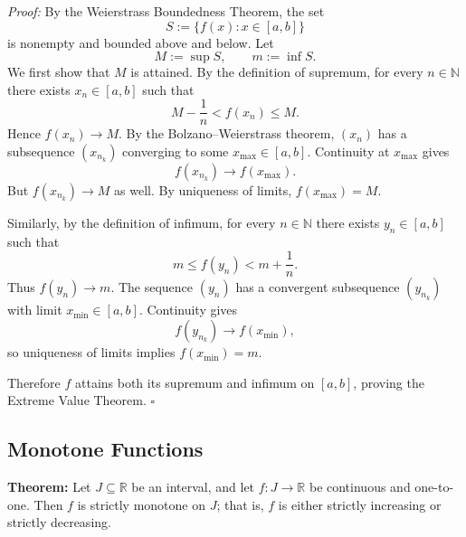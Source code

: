 \documentclass[a4paper,11pt,abstracton]{scrartcl}
\newcommand{\RR}{\mathbb{R}}
\theoremstyle{dotlessP}
\theoremstyle{dotlessS}
\theoremstyle{remark}
\theoremstyle{definition}
\begin{document}
\begin{claim_box}
\textit{Proof:}
By the Weierstrass Boundedness Theorem, the set
\[
    S:=\{f(x):x\in[a,b]\}
\]
is nonempty and bounded above and below. Let
\[
    M:=\sup S,\qquad m:=\inf S.
\]
We first show that $M$ is attained. By the definition of supremum, for every $n\in\mathbb N$ there exists $x_n\in[a,b]$ such that
\[
    M-\frac1n<f(x_n)\le M.
\]
Hence $f(x_n)\to M$. By the Bolzano--Weierstrass theorem, $(x_n)$ has a subsequence $(x_{n_k})$ converging to some $x_{\max}\in[a,b]$. Continuity at $x_{\max}$ gives
\[
    f(x_{n_k})\longrightarrow f(x_{\max}).
\]
But $f(x_{n_k})\to M$ as well. By uniqueness of limits, $f(x_{\max})=M$.

Similarly, by the definition of infimum, for every $n\in\mathbb N$ there exists $y_n\in[a,b]$ such that
\[
    m\le f(y_n)<m+\frac1n.
\]
Thus $f(y_n)\to m$. The sequence $(y_n)$ has a convergent subsequence $(y_{n_k})$ with limit $x_{\min}\in[a,b]$. Continuity gives
\[
    f(y_{n_k})\longrightarrow f(x_{\min}),
\]
so uniqueness of limits implies $f(x_{\min})=m$.

Therefore $f$ attains both its supremum and infimum on $[a,b]$, proving the Extreme Value Theorem.
\hfill$\square$
\end{claim_box}

\subsection{Monotone Functions}

\begin{problem_box}
\textbf{Theorem:}
Let $J\subseteq\RR$ be an interval, and let $f:J\to\RR$ be continuous and one-to-one. Then $f$ is strictly monotone on $J$; that is, $f$ is either strictly increasing or strictly decreasing.
\end{problem_box}
\end{document}

